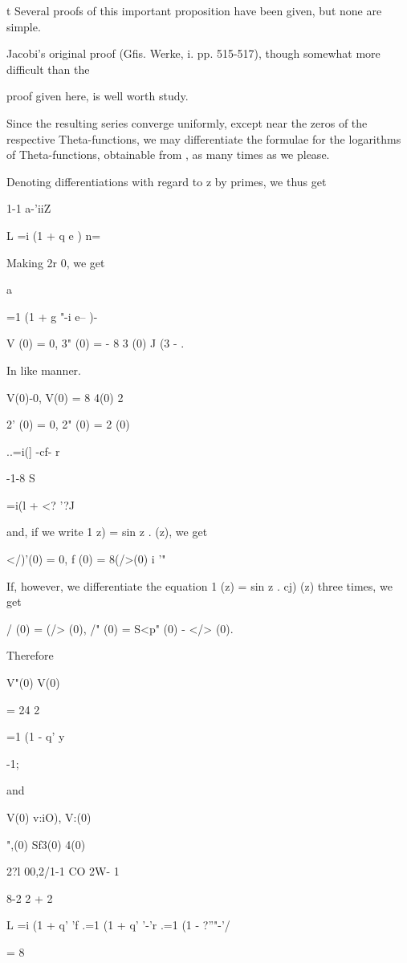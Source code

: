 t Several proofs of this important proposition have been given, but
none are simple.

Jacobi's original proof (Gfis. Werke, i. pp. 515-517), though somewhat
more difficult than the

proof given here, is well worth study.

%
%

Since the resulting series converge uniformly, except near the zeros
of the respective Theta-functions, we may differentiate the formulae
for the logarithms of Theta-functions, obtainable from , as many
times as we please.

Denoting differentiations with regard to z by primes, we thus get


1-1 a-'iiZ

L =i (1 + q e ) n=\

Making 2r 0, we get

a%

=1 (1 + g "-i e-- )-

V (0) = 0, 3" (0) = - 8 3 (0) J (3 - .

In like manner.

V(0)-0, V(0) = 8 4(0) 2

 2' (0) = 0, 2" (0) = 2 (0)

..=i(] -cf- r

-1-8 S

 =i(l + <? '?J

and, if we write 1 z) = sin z . (z), we get

</)'(0) = 0, f (0) = 8(/>(0) i '"

If, however, we differentiate the equation 1 (z) = sin z . cj) (z)
three times, we get

 / (0) = (/> (0), /" (0) = S<p" (0) - </> (0).

Therefore

V"(0) V(0)

= 24 2

=1 (1 - q' y

-1;

and

V(0) v:iO), V:(0)

",(0) Sf3(0) 4(0)

 2?l 00,2/1-1 CO 2W- 1

8-2 2 + 2

L =i (1 + q' 'f .=1 (1 + q' '-'r .=1 (1 - ?''"-'/

= 8

